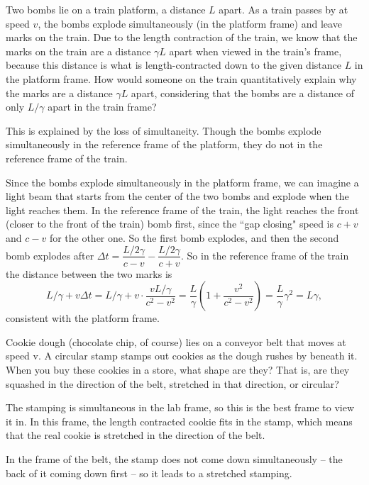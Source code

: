 \documentclass[11pt]{scrartcl}
\begin{document}
\begin{prob}[Morin]
    Two bombs lie on a train platform, a distance $L$ apart. As a train passes
by at speed $v$, the bombs explode simultaneously (in the platform frame)
and leave marks on the train. Due to the length contraction of the train,
we know that the marks on the train are a distance $\gamma L$ apart when viewed
in the train’s frame, because this distance is what is length-contracted
down to the given distance $L$ in the platform frame.
How would someone on the train quantitatively explain why the marks
are a distance $\gamma L$ apart, considering that the bombs are a distance of only
$L/\gamma$ apart in the train frame?
\end{prob}
\begin{sol}
    This is explained by the loss of simultaneity. Though the bombs explode simultaneously in the reference frame of the platform, they do not in the reference frame of the train.

Since the bombs explode simultaneously in the platform frame, we can imagine a light beam that starts from the center of the two bombs and explode when the light reaches them. In the reference frame of the train, the light reaches the front (closer to the front of the train) bomb first, since the ``gap closing" speed is $c+v$ and $c-v$ for the other one. So the first bomb explodes, and then the second bomb explodes after $\Delta t = \dfrac{L/2\gamma}{c-v}-\dfrac{L/2\gamma}{c+v}$. So in the reference frame of the train the distance between the two marks is
$$L/\gamma + v\Delta t = L/\gamma + v\cdot \dfrac{vL/\gamma}{c^2-v^2} = \dfrac{L}{\gamma}\left(1+\dfrac{v^2}{c^2 - v^2}\right)=\dfrac{L}{\gamma}\gamma^2 = L\gamma,$$
consistent with the platform frame.
\end{sol}

\begin{prob}[Morin]
    Cookie dough (chocolate chip, of course) lies on a conveyor belt that
moves at speed v. A circular stamp stamps out cookies as the dough
rushes by beneath it. When you buy these cookies in a store, what shape
are they? That is, are they squashed in the direction of the belt, stretched
in that direction, or circular?
\end{prob}
\begin{sol}
    The stamping is simultaneous in the lab frame, so this is the best frame to view it in. In this frame, the length contracted cookie fits in the stamp, which means that the real cookie is stretched in the direction of the belt.

    In the frame of the belt, the stamp does not come down simultaneously -- the back of it coming down first -- so it leads to a stretched stamping.
\end{sol}
\end{document}
